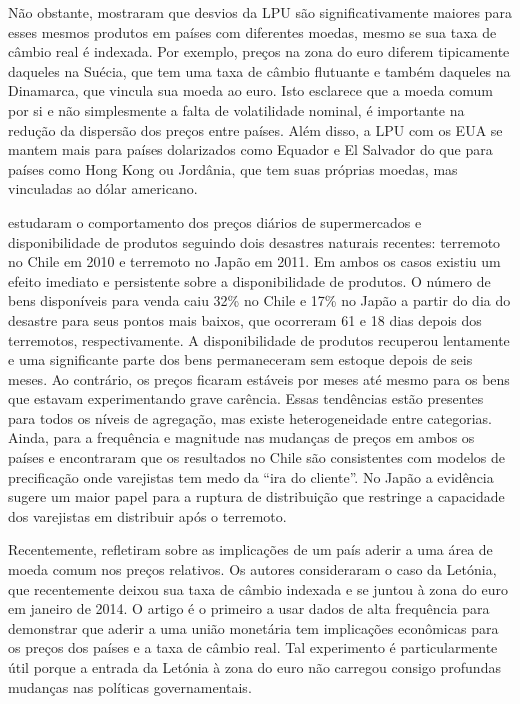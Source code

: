 \documentclass[twoside,a4paper,11pt]{report}
\begin{document}
Não obstante, \citet{cavallo2012currency} mostraram que desvios da LPU são significativamente maiores para esses mesmos produtos em países com diferentes moedas, mesmo se sua taxa de câmbio real é indexada. Por exemplo, preços na zona do euro diferem tipicamente daqueles na Suécia, que tem uma taxa de câmbio flutuante e também daqueles na Dinamarca, que vincula sua moeda ao euro. Isto esclarece que a moeda comum por si e não simplesmente a falta de volatilidade nominal, é importante na redução da dispersão dos preços entre países. Além disso, a LPU com os EUA se mantem mais para países dolarizados como Equador e El Salvador do que para países como Hong Kong ou Jordânia, que tem suas próprias moedas, mas vinculadas ao dólar americano. 

\citet{cavallo2013prices}	estudaram o comportamento dos preços diários de supermercados e disponibilidade de produtos seguindo dois desastres naturais recentes: terremoto no Chile em 2010 e terremoto no Japão em 2011. Em ambos os casos existiu um efeito imediato e persistente sobre a disponibilidade de produtos. O número de bens disponíveis para venda caiu 32\% no Chile e 17\% no Japão a partir do dia do desastre para seus pontos mais baixos, que ocorreram 61 e 18 dias depois dos terremotos, respectivamente. A disponibilidade de produtos recuperou lentamente e uma significante parte dos bens permaneceram sem estoque depois de seis meses. Ao contrário, os preços ficaram estáveis por meses até mesmo para os bens que estavam experimentando grave carência. Essas tendências estão presentes para todos os níveis de agregação, mas existe heterogeneidade entre categorias. Ainda, \citet{cavallo2013prices} para a frequência e magnitude nas mudanças de preços em ambos os países e encontraram que os resultados no Chile são consistentes com modelos de precificação onde varejistas tem medo da “ira do cliente”. No Japão a evidência sugere um maior papel para a ruptura de distribuição que restringe a capacidade dos varejistas em distribuir após o terremoto. 

Recentemente, \citet{cavallo2014price} refletiram sobre as implicações de um país aderir a uma área de moeda comum nos preços relativos. Os autores consideraram o caso da Letónia, que recentemente deixou sua taxa de câmbio indexada e se juntou à zona do euro em janeiro de 2014. O artigo é o primeiro a usar dados de alta frequência para demonstrar que aderir a uma união monetária tem implicações econômicas para os preços dos países e a taxa de câmbio real. Tal experimento é particularmente útil porque a entrada da Letónia à zona do euro não carregou consigo profundas mudanças nas políticas governamentais. 
\end{document}
